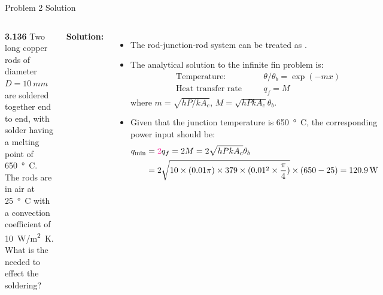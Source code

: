 \documentclass[9pt, aspectratio=169, handout]{beamer}
\begin{document}
\begin{frame}{Problem 2 Solution}
    \begin{columns}
        \textbf{3.136} Two long copper rods of diameter $D=\SI{10}{mm}$ are soldered together end to end, with solder having a melting point of \SI{650}{\degree C}. The rods are in air at \SI{25}{\degree C} with a convection coefficient of \SI{10}{W/m^2.K}. What is the  needed to effect the soldering?
        \vspace{2ex}

        \textbf{Solution:}
        \begin{itemize}
            \item The rod-junction-rod system can be treated as .
            \item The analytical solution to the infinite fin problem is:
                \begin{subequations}
                    \begin{alignat}{2}
                        &\text{Temperature:} &\quad & \theta/\theta_b = \exp(-m x) \\
                        &\text{Heat transfer rate} &\quad & q_f = M 
                    \end{alignat}
                \end{subequations}
                where $m = \sqrt{hP/kA_c}$, $M = \sqrt{hPkA_c}\theta_b$.
            \item Given that the junction temperature is \SI{650}{\degree C}, the corresponding power input should be:
                \begin{equation}
                    \begin{aligned}
                        q_{\text{min}} &= \myhl{2}q_f = 2M = 2\sqrt{hPkA_c}\theta_b \\
                        &= 2\sqrt{10\times (0.01\pi)\times 379\times (0.01^2\times \frac{\pi}{4})}\times (650-25) = \SI{120.9}{W}
                    \end{aligned}
                \end{equation}
        \end{itemize}
    \end{columns}
\end{frame}
\end{document}
